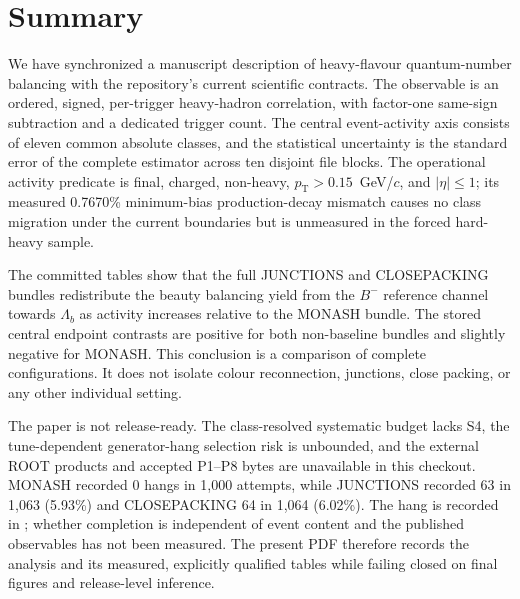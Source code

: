 \section{Summary}
\label{sec:summary}

We have synchronized a manuscript description of heavy-flavour
quantum-number balancing with the repository's current scientific contracts.
The observable is an ordered, signed, per-trigger heavy-hadron correlation,
with factor-one same-sign subtraction and a dedicated trigger count.
The central event-activity axis consists of eleven common absolute classes,
and the statistical uncertainty is the standard error of the complete
estimator across ten disjoint file blocks. The operational activity predicate
is final, charged, non-heavy, $p_{\mathrm{T}}>0.15$~GeV/$c$, and
$|\eta|\leq1$; its measured 0.7670\% minimum-bias production-decay mismatch
causes no class migration under the current boundaries but is unmeasured in
the forced hard-heavy sample.

The committed tables show that the full JUNCTIONS and CLOSEPACKING bundles
redistribute the beauty balancing yield from the $B^-$ reference channel
towards $\Lambda_b$ as activity increases relative to the MONASH bundle. The
stored central endpoint contrasts are positive for both non-baseline bundles
and slightly negative for MONASH. This conclusion is a comparison of
complete configurations. It does not isolate colour reconnection, junctions,
close packing, or any other individual setting.

The paper is not release-ready. The class-resolved systematic budget lacks S4,
the tune-dependent generator-hang selection risk is unbounded, and the external
ROOT products and accepted P1--P8 bytes are unavailable in this checkout.
MONASH recorded 0 hangs in 1,000 attempts, while JUNCTIONS recorded 63 in
1,063 (5.93\%) and CLOSEPACKING 64 in 1,064 (6.02\%). The hang is recorded in
; whether completion is independent of event
content and the published observables has not been measured. The
present PDF therefore records the analysis and its
measured, explicitly qualified tables while failing closed on final figures
and release-level inference.
